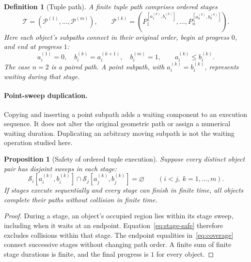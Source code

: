 \documentclass[11pt,a4paper]{article}
\newtheorem{definition}{Definition}
\newtheorem{proposition}{Proposition}
\theoremstyle{remark}
\newcommand{\Sweep}{\mathcal S}
\begin{document}
\begin{definition}[Tuple path]
A finite tuple path comprises ordered stages
\begin{equation}
 \mathcal T=(\mathcal P^{(1)},\ldots,\mathcal P^{(m)}),\qquad
 \mathcal P^{(k)}=(P_1^{[a_1^{(k)},b_1^{(k)}]},\ldots,
                   P_n^{[a_n^{(k)},b_n^{(k)}]}).
 \label{eq:tuple}
\end{equation}
Here each object's subpaths connect in their original order,
begin at progress $0$, and end at progress $1$:
\begin{equation}
 a_i^{(1)}=0,\quad b_i^{(k)}=a_i^{(k+1)},\quad b_i^{(m)}=1,
 \qquad a_i^{(k)}\le b_i^{(k)}.
 \label{eq:coverage}
\end{equation}
The case $n=2$ is a paired path. A point subpath, with $a_i^{(k)}=b_i^{(k)}$,
represents waiting during that stage.
\end{definition}

\paragraph{Point-sweep duplication.}
Copying and inserting a point subpath adds a waiting component to an
execution sequence. It does not alter the original geometric path or assign
a numerical waiting duration. Duplicating an arbitrary moving subpath is not
the waiting operation studied here.

\begin{proposition}[Safety of ordered tuple execution]
Suppose every distinct object pair has disjoint sweeps in each stage:
\begin{equation}
 \Sweep_i[a_i^{(k)},b_i^{(k)}]\cap
 \Sweep_j[a_j^{(k)},b_j^{(k)}]=\varnothing
 \qquad(i<j,\ k=1,\ldots,m).
 \label{eq:stage-safe}
\end{equation}
If stages execute sequentially and every stage can finish in finite time,
all objects complete their paths without collision in finite time.
\end{proposition}
\begin{proof}
During a stage, an object's occupied region lies within its stage sweep,
including when it waits at an endpoint. Equation~\eqref{eq:stage-safe}
therefore excludes collisions within that stage. The endpoint equalities
in~\eqref{eq:coverage} connect successive stages without changing path order.
A finite sum of finite stage durations is finite, and the final progress is
$1$ for every object.
\end{proof}
\end{document}
